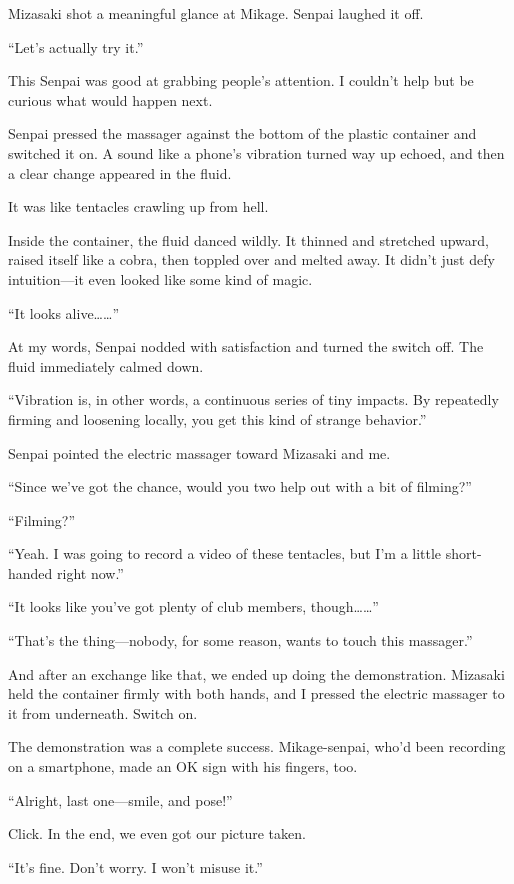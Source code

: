 \documentclass[
    a4paper,
    12pt,
    twoside,
    openany,
    UTF8,
    fontset=windows
]{ctexbook}
\begin{document}
Mizasaki shot a meaningful glance at Mikage. Senpai laughed it off.

``Let's actually try it.''

This Senpai was good at grabbing people's attention. I couldn't help but be curious what would happen next.

Senpai pressed the massager against the bottom of the plastic container and switched it on. A sound like a phone's vibration turned way up echoed, and then a clear change appeared in the fluid.

It was like tentacles crawling up from hell.

Inside the container, the fluid danced wildly. It thinned and stretched upward, raised itself like a cobra, then toppled over and melted away. It didn't just defy intuition---it even looked like some kind of magic.

``It looks alive\dots\dots''

At my words, Senpai nodded with satisfaction and turned the switch off. The fluid immediately calmed down.

``Vibration is, in other words, a continuous series of tiny impacts. By repeatedly firming and loosening locally, you get this kind of strange behavior.''

Senpai pointed the electric massager toward Mizasaki and me.

``Since we've got the chance, would you two help out with a bit of filming?''

``Filming?''

``Yeah. I was going to record a video of these tentacles, but I'm a little short-handed right now.''

``It looks like you've got plenty of club members, though\dots\dots''

``That's the thing---nobody, for some reason, wants to touch this massager.''

And after an exchange like that, we ended up doing the demonstration. Mizasaki held the container firmly with both hands, and I pressed the electric massager to it from underneath. Switch on.

The demonstration was a complete success. Mikage-senpai, who'd been recording on a smartphone, made an OK sign with his fingers, too.

``Alright, last one---smile, and pose!''

Click. In the end, we even got our picture taken.

``It's fine. Don't worry. I won't misuse it.''
\end{document}
